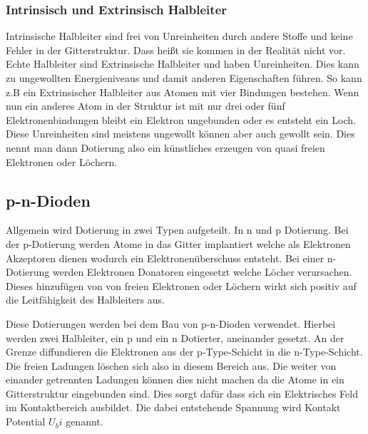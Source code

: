 \subsubsection{Intrinsisch und Extrinsisch Halbleiter}
Intrinsische Halbleiter sind frei von Unreinheiten durch andere Stoffe und keine Fehler in der Gitterstruktur. Dass heißt sie kommen in der Realität nicht vor. Echte Halbleiter sind Extrinsische Halbleiter und haben Unreinheiten. Dies kann zu ungewollten Energieniveaus und damit anderen Eigenschaften führen. So kann z.B ein Extrinsischer Halbleiter aus Atomen mit vier Bindungen bestehen. Wenn nun ein anderes Atom in der Struktur ist mit nur drei oder fünf Elektronenbindungen bleibt ein Elektron ungebunden oder es entsteht ein Loch. Diese Unreinheiten sind meistens ungewollt können aber auch gewollt sein. Dies nennt man dann Dotierung also ein künstliches erzeugen von quasi freien Elektronen oder Löchern.
\subsection{p-n-Dioden}
Allgemein wird Dotierung in zwei Typen aufgeteilt. In n und p Dotierung. Bei der p-Dotierung werden Atome in das Gitter implantiert welche als Elektronen Akzeptoren dienen wodurch ein Elektronenüberschuss entsteht. Bei einer n-Dotierung werden Elektronen Donatoren eingesetzt welche Löcher verursachen. Dieses hinzufügen von von freien Elektronen oder Löchern wirkt sich positiv auf die Leitfähigkeit des Halbleiters aus.\par
Diese Dotierungen werden bei dem Bau von p-n-Dioden verwendet. Hierbei werden zwei Halbleiter, ein p und ein n Dotierter, aneinander gesetzt. An der Grenze diffundieren die Elektronen aus der p-Type-Schicht in die n-Type-Schicht. Die freien Ladungen löschen sich also in diesem Bereich aus. Die weiter von einander getrennten Ladungen können dies nicht machen da die Atome in ein Gitterstruktur eingebunden sind. Dies sorgt dafür dass sich ein Elektrisches Feld im Kontaktbereich ausbildet. Die dabei entstehende Spannung wird Kontakt Potential $U_bi$ genannt.  
